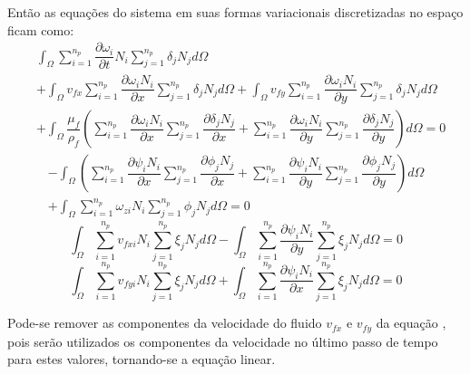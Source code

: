 Então as equações do sistema em suas formas variacionais discretizadas no espaço ficam como:
\begin{align}
    &\int_{\Omega}
    \sum_{i=1}^{n_p} \dfrac{\partial \omega_i}{\partial t} N_i
    \sum_{j=1}^{n_p} \delta_j N_j
    d\Omega \nonumber\\&+
    \int_{\Omega}
    v_{fx}
    \sum_{i=1}^{n_p} \dfrac{\partial \omega_i N_i}{\partial x}
    \sum_{j=1}^{n_p} \delta_j N_j
    d\Omega +
    \int_{\Omega}
    v_{fy}
    \sum_{i=1}^{n_p} \dfrac{\partial \omega_i N_i}{\partial y}
    \sum_{j=1}^{n_p} \delta_j N_j
    d\Omega \nonumber\\&+
    \int_{\Omega}
    \dfrac{\mu_f}{\rho_f}
    \left(
    \sum_{i=1}^{n_p} \dfrac{\partial \omega_i N_i}{\partial x}
    \sum_{j=1}^{n_p} \dfrac{\partial \delta_j N_j}{\partial x} +
    \sum_{i=1}^{n_p} \dfrac{\partial \omega_i N_i}{\partial y}
    \sum_{j=1}^{n_p} \dfrac{\partial \delta_j N_j}{\partial y}
    \right) d\Omega= 0
    \label{temp1}
\end{align}
\begin{align}
    -\int_{\Omega}
    \left(
    \sum_{i=1}^{n_p} \dfrac{\partial \psi_i N_i}{\partial x}
    \sum_{j=1}^{n_p} \dfrac{\partial \phi_j N_j}{\partial x} +
    \sum_{i=1}^{n_p} \dfrac{\partial \psi_i N_i}{\partial y}
    \sum_{j=1}^{n_p} \dfrac{\partial \phi_j N_j}{\partial y}
    \right) d\Omega \nonumber\\+
    \int_{\Omega}
    \sum_{i=1}^{n_p} \omega_{zi} N_i
    \sum_{j=1}^{n_p} \phi_j N_j
    d\Omega = 0
\end{align}
\begin{equation}
    \int_{\Omega}
    \sum_{i=1}^{n_p} v_{fxi} N_i
    \sum_{j=1}^{n_p} \xi_j N_j
    d\Omega -
    \int_{\Omega}
    \sum_{i=1}^{n_p} \dfrac{\partial \psi_i N_i}{\partial y}
    \sum_{j=1}^{n_p} \xi_j N_j
    d\Omega = 0
\end{equation}
\begin{equation}
    \int_{\Omega}
    \sum_{i=1}^{n_p} v_{fyi} N_i
    \sum_{j=1}^{n_p} \xi_j N_j
    d\Omega +
    \int_{\Omega}
    \sum_{i=1}^{n_p} \dfrac{\partial \psi_i N_i}{\partial x}
    \sum_{j=1}^{n_p} \xi_j N_j
    d\Omega = 0
\end{equation}

Pode-se remover as componentes da velocidade do fluido $v_{fx}$ e $v_{fy}$ da equação , pois serão utilizados os componentes da velocidade no último passo de tempo para estes valores, tornando-se a equação linear.

